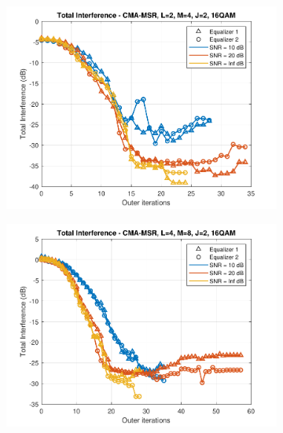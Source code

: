 \begin{figure}
\begin{subfigure}[b]{0.45\textwidth}
		\includegraphics[width=\linewidth]{./figs/BF_RTR_MSR_TI_16QAM_L=2_M=4_J=2_K=1000.pdf}
		\label{fig:rtr_msr_ti16_24}
	\end{subfigure}
	\begin{subfigure}[b]{0.45\textwidth}
		\includegraphics[width=\linewidth]{./figs/BF_RTR_MSR_TI_16QAM_L=4_M=8_J=2_K=1000.pdf}
		\label{fig:rtr_msr_ti16_48}
	\end{subfigure}
	\begin{subfigure}[b]{0.45\textwidth}

\end{subfigure}
\end{figure}
